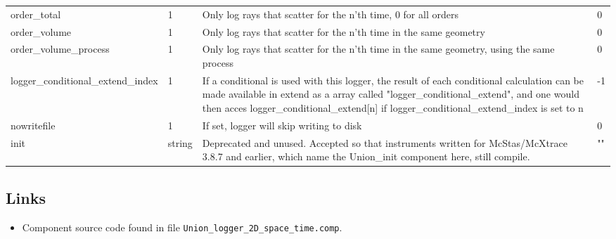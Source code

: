 \begin{longtable}{p{}p{}p{}p{}}
order\_total & 1 & Only log rays that scatter for the n'th time, 0 for all orders & 0 \\
order\_volume & 1 & Only log rays that scatter for the n'th time in the same geometry & 0 \\
order\_volume\_process & 1 & Only log rays that scatter for the n'th time in the same geometry, using the same process & 0 \\
logger\_conditional\_extend\_index & 1 & If a conditional is used with this logger, the result of each conditional calculation can be made available in extend as a array called "logger\_conditional\_extend", and one would then acces logger\_conditional\_extend[n] if logger\_conditional\_extend\_index is set to n & -1 \\
nowritefile & 1 & If set, logger will skip writing to disk & 0 \\
init & string & Deprecated and unused. Accepted so that instruments written for McStas/McXtrace 3.8.7 and earlier, which name the Union\_init component here, still compile. & "" \\
\bottomrule
\end{longtable}

\subsection*{Links}
\begin{itemize}
  \item Component source code found in file \texttt{Union\_logger\_2D\_space\_time.comp}.
\end{itemize}
